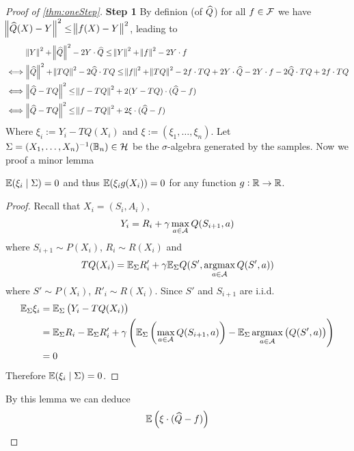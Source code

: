 \begin{proof}[Proof of \cref{thm:oneStep}]
  \textbf{Step 1}
  By definion (of $\widehat{Q}$) for all $f \in \mathcal{F}$ we have
  $\norm{\widehat{Q}(X) - Y}^2 \leq \norm{f(X) - Y}^2$, leading to
  \begin{align}
    & \norm{Y}^2 + \norm{\widehat{Q}}^2 - 2 Y\cdot \widehat{Q}
    \leq \norm{Y}^2 + \norm{f}^2 - 2 Y\cdot f
    \\ \iff & \norm{\widehat{Q}}^2 + \norm{TQ}^2 - 2 \widehat{Q}\cdot TQ 
    \leq \norm{f}^2 + \norm{TQ}^2 - 2 f\cdot TQ + 2 Y\cdot \widehat{Q}
    - 2 Y \cdot f - 2 \widehat{Q}\cdot TQ + 2f\cdot TQ
    \\ \iff & \norm{\widehat{Q} - TQ}^2
    \leq \norm{f - TQ}^2 + 2(Y - TQ)\cdot(\widehat{Q} - f) 
    \\ \iff & \norm{\widehat{Q} - TQ}^2
    \leq \norm{f - TQ}^2 + 2 \xi \cdot (\widehat{Q} - f)
    \label{eq:c2first}
  \end{align}
  Where $ \xi_i := Y_i - TQ(X_i) $ and $\xi := (\xi_1, \dots, \xi_n)$.
  Let $\Sigma = (X_1, \dots, X_n)^{-1}(\mathbb{B}_n) \in \mathcal{H}$
  be the $\sigma$-algebra generated by the samples.
  Now we proof a minor lemma
  \begin{prop}
    $\mathbb{E}(\xi_i \mid \Sigma) = 0$ and thus
    $\mathbb{E}(\xi_i g(X_i)) = 0$ for any function $g:\mathbb{R}\to \mathbb{R}$.
    \label{lem:YTQ}
  \end{prop}
  \begin{proof}
    Recall that $X_i = (S_i, A_i)$,
    \begin{align*}
      Y_i = R_i + \gamma \max_{a \in \mathcal{A}} Q(S_{i+1}, a)
    \end{align*}
    where $S_{i+1} \sim P(X_i)$, $R_i \sim R(X_i)$ and
    \begin{align*}
      TQ(X_i) = \mathbb{E}_\Sigma R'_i
      + \gamma \mathbb{E}_\Sigma Q(S', \operatorname*{argmax}_{a \in \mathcal{A}} Q(S', a))
    \end{align*}
    where $S' \sim P(X_i)$, $R'_i \sim R(X_i)$.
    Since $S'$ and $S_{i+1}$ are i.i.d.
    \begin{align*}
      \mathbb{E}_\Sigma \xi_i & = \mathbb{E}_\Sigma \left( Y_i - TQ(X_i) \right)
      \\ & = \mathbb{E}_\Sigma R_i - \mathbb{E}_\Sigma R'_i
      + \gamma \left( \mathbb{E}_\Sigma \left( \max_{a \in\mathcal{A}} Q(S_{i+1}, a) \right)
      - \mathbb{E}_\Sigma \operatorname*{argmax}_{a \in \mathcal{A}} \left(  Q(S', a) \right) \right)
      \\ & = 0 
    \end{align*}
    Therefore $\mathbb{E}(\xi_i \mid \Sigma) = 0$.
  \end{proof}
  By this lemma we can deduce
  \begin{equation}
    \E \left( \xi \cdot (\wh{Q} - f) \right)

\end{equation}
\end{proof}
